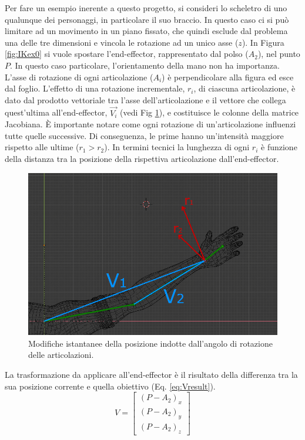 Per fare un esempio inerente a questo progetto, si consideri lo scheletro di uno qualunque dei personaggi, in particolare il suo braccio.
In questo caso ci si può limitare ad un movimento in un piano fissato, che quindi esclude dal problema una delle tre dimensioni e vincola le rotazione ad un unico asse ($z$).
In Figura \ref{fig:IKex0} si vuole spostare l'end-effector, rappresentato dal polso ($A_2$), nel punto $P$. In questo caso particolare, l'orientamento della mano non ha importanza.
L'asse di rotazione di ogni articolazione ($A_i$) è perpendicolare alla figura ed esce dal foglio.
L'effetto di una rotazione incrementale, $r_i$, di ciascuna articolazione, è dato dal prodotto vettoriale tra l'asse dell'articolazione e il vettore che collega quest'ultima all'end-effector, $\vec{V_i}$ (vedi Fig \ref{fig:IKex1}), e costituisce le colonne della matrice Jacobiana.
È importante notare come ogni rotazione di un'articolazione influenzi tutte quelle successive. Di conseguenza, le prime hanno un'intensità maggiore rispetto alle ultime ($r_1>r_2$). In termini tecnici la lunghezza di ogni $r_i$ è funzione della distanza tra la posizione della rispettiva articolazione dall'end-effector.

\begin{figure}
\centering
\includegraphics[width=.8\textwidth]{Figures/18}
\decoRule
\caption[Movimento indotto]{Modifiche istantanee della posizione indotte dall'angolo di rotazione delle articolazioni.}
\label{fig:IKex1}
\end{figure}

La trasformazione da applicare all'end-effector è il risultato della differenza tra la sua posizione corrente e quella obiettivo (Eq. \ref{eq:Vresult}).
\begin{equation}\label{eq:Vresult}
    V=
    \begin{bmatrix}
        (P - A_2)_x\\
        (P - A_2)_y\\
        (P - A_2)_z
    \end{bmatrix}
\end{equation}

